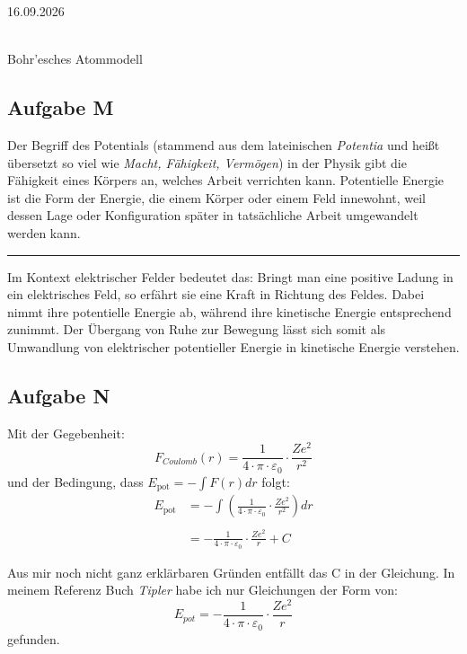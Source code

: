 \documentclass[11pt,a4paper,oneside]{article}
\newcommand{\lessondate}[1]{\noindent\hfill\textcolor{MarginalGray}{\textsc{#1}} \\ \vspace{0.5cm}}
\begin{document}
	\lessondate{16.09.2026}\\
	\begin{loesung}{Bohr'esches Atommodell}
		\subsection*{Aufgabe M}
		Der Begriff des Potentials (stammend aus dem lateinischen \textit{Potentia} und heißt übersetzt so viel wie \textit{Macht, Fähigkeit, Vermögen}) in der Physik gibt die Fähigkeit eines Körpers an, welches Arbeit verrichten kann. Potentielle Energie ist die Form der Energie, die einem Körper oder einem Feld innewohnt, weil dessen Lage oder Konfiguration später in tatsächliche Arbeit umgewandelt werden kann. \\
		\hrule 
		\vspace{5mm}
		Im Kontext elektrischer Felder bedeutet das: Bringt man eine positive Ladung in ein elektrisches Feld, so erfährt sie eine Kraft in Richtung des Feldes. Dabei nimmt ihre potentielle Energie ab, während ihre kinetische Energie entsprechend zunimmt. Der Übergang von Ruhe zur Bewegung lässt sich somit als Umwandlung von elektrischer potentieller Energie in kinetische Energie verstehen.\\
		
		\subsection*{Aufgabe N}
		Mit der Gegebenheit:
		\[
		F_{Coulomb} (r) = \frac{1}{4 \cdot \pi \cdot \varepsilon_0} \cdot \frac{Ze^2}{r^2} 
		\]
		und der Bedingung, dass $E_{\text{pot}} = - \int F(r) dr$ folgt: 
		\begin{align*}
			E_{\text{pot}} &= - \int \left(\frac{1}{4 \cdot \pi \cdot \varepsilon_0} \cdot \frac{Ze^2}{r^2}\right)dr \\\\
			&= - \frac{1}{4 \cdot \pi \cdot \varepsilon_0} \cdot \frac{Ze^2}{r} + C 
		\end{align*}
		\begin{infobox}
 			Aus mir noch nicht ganz erklärbaren Gründen entfällt das C in der Gleichung. In meinem Referenz Buch \textit{Tipler} habe ich nur Gleichungen der Form von:
 			\[
 			\boxed{E_{pot} = - \frac{1}{4 \cdot \pi \cdot \varepsilon_0} \cdot \frac{Ze^2}{r}}
 			\]
 			gefunden.
		\end{infobox}
	\end{loesung}
	
	\newpage
	
\end{document}

